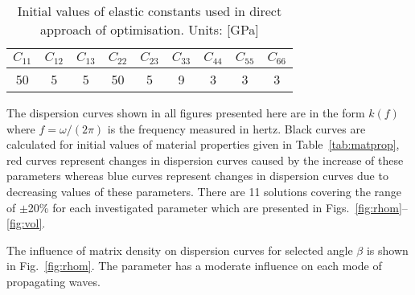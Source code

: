  
\begin{table}[h!]
\caption{Initial values of elastic constants used in direct approach of optimisation. Units: [GPa]}

		\renewcommand{\arraystretch}{1.3}
		\centering \footnotesize
		
		\begin{tabular}{ccccccccc} 
			
			\toprule
			\(C_{11}\) & \(C_{12}\) & \(C_{13}\)  & \(C_{22}\) & \(C_{23}\) & \(C_{33}\) & 
			\(C_{44}\)  & \(C_{55}\) & \(C_{66}\) \\
			\midrule
			50 &5& 5&  50 & 5 & 9 & 3 & 3 & 3\\
			
			\bottomrule 
		\end{tabular} 
		\label{tab:Ctensor_initial}
	
\end{table}

 	
 The dispersion curves shown in all figures presented here are in the form \(k(f)\) where 
 \(f=\omega/(2\pi)\) is the frequency measured in hertz. Black curves are calculated for 
 initial values of material properties given in Table~\ref{tab:matprop}, red curves 
 represent changes in dispersion curves caused by the increase of these parameters 
 whereas blue curves represent changes in dispersion curves due to decreasing values 
 of these parameters. There are 11 solutions covering the range of \(\pm\)20\% for each 
 investigated parameter which are presented in Figs.~\ref{fig:rhom}--\ref{fig:vol}.
 
 The influence of matrix density on dispersion curves for selected angle \(\beta\) is 
 shown in Fig.~\ref{fig:rhom}. The parameter has a moderate influence on each mode of 
 propagating waves.
 
